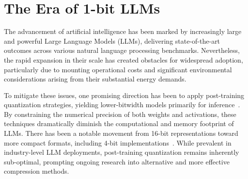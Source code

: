 \begin{abstract}
The emergence of methods like BitNet~\cite{bitnet} signals the dawn of a new generation of 1-bit Large Language Models (LLMs). This study presents \textbf{}, a novel 1-bit LLM configuration where every parameter (or weight) is restricted to the ternary set \{-1, 0, 1\}. This design achieves parity with conventional full-precision Transformer LLMs (i.e., those using FP16 or BF16) in terms of perplexity and downstream task performance when evaluated with the same model size and quantity of training data. Remarkably, it does so while greatly improving efficiency regarding latency, memory usage, throughput, and energy demands. Importantly, the 1.58-bit LLM establishes a new scaling paradigm and outlines a training methodology for next-generation LLMs that excel in both effectiveness and computational cost. Additionally, it introduces fresh opportunities for developing new computational frameworks and facilitates the creation of dedicated hardware tailored for 1-bit LLM architectures.
\end{abstract}

\section{The Era of 1-bit LLMs}

The advancement of artificial intelligence has been marked by increasingly large and powerful Large Language Models (LLMs), delivering state-of-the-art outcomes across various natural language processing benchmarks. Nevertheless, the rapid expansion in their scale has created obstacles for widespread adoption, particularly due to mounting operational costs and significant environmental considerations arising from their substantial energy demands.

To mitigate these issues, one promising direction has been to apply post-training quantization strategies, yielding lower-bitwidth models primarily for inference~\cite{smoothquant, gptq, quip, quip_sharp}. By constraining the numerical precision of both weights and activations, these techniques dramatically diminish the computational and memory footprint of LLMs. There has been a notable movement from 16-bit representations toward more compact formats, including 4-bit implementations~\cite{gptq, awq}. While prevalent in industry-level LLM deployments, post-training quantization remains inherently sub-optimal, prompting ongoing research into alternative and more effective compression methods.

